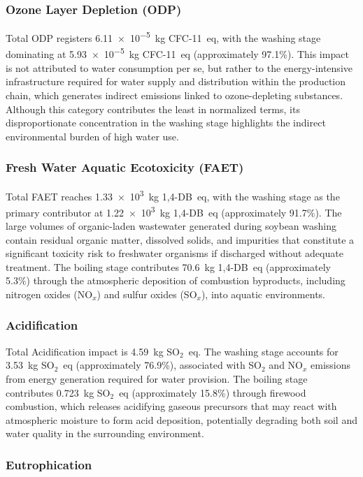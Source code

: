 \documentclass[12pt,a4paper]{article}
\begin{document}
\subsubsection{Ozone Layer Depletion (ODP)}

Total ODP registers \num{6.11e-5}~kg CFC-11~eq, with the washing stage dominating at
\num{5.93e-5}~kg CFC-11~eq (approximately 97.1\%). This impact is not attributed to water consumption
per se, but rather to the energy-intensive infrastructure required for water supply and distribution
within the production chain, which generates indirect emissions linked to ozone-depleting substances.
Although this category contributes the least in normalized terms, its disproportionate concentration
in the washing stage highlights the indirect environmental burden of high water use.

\subsubsection{Fresh Water Aquatic Ecotoxicity (FAET)}

Total FAET reaches \num{1.33e3}~kg 1,4-DB~eq, with the washing stage as the primary contributor at
\num{1.22e3}~kg 1,4-DB~eq (approximately 91.7\%). The large volumes of organic-laden wastewater
generated during soybean washing contain residual organic matter, dissolved solids, and impurities that
constitute a significant toxicity risk to freshwater organisms if discharged without adequate treatment.
The boiling stage contributes 70.6~kg 1,4-DB~eq (approximately 5.3\%) through the atmospheric
deposition of combustion byproducts, including nitrogen oxides (NO$_x$) and sulfur oxides (SO$_x$),
into aquatic environments.

\subsubsection{Acidification}

Total Acidification impact is 4.59~kg SO$_2$~eq. The washing stage accounts for 3.53~kg SO$_2$~eq
(approximately 76.9\%), associated with SO$_2$ and NO$_x$ emissions from energy generation required
for water provision. The boiling stage contributes 0.723~kg SO$_2$~eq (approximately 15.8\%) through
firewood combustion, which releases acidifying gaseous precursors that may react with atmospheric
moisture to form acid deposition, potentially degrading both soil and water quality in the surrounding
environment.

\subsubsection{Eutrophication}
\end{document}
